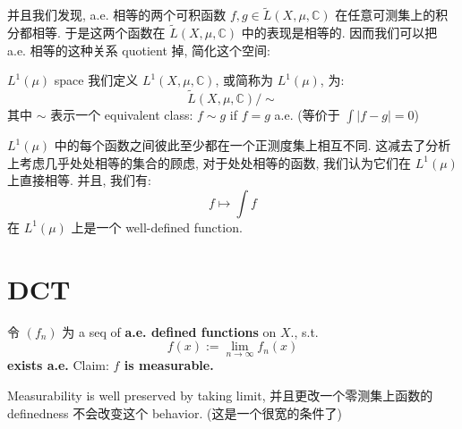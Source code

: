 \documentclass[lang=cn,11pt]{elegantbook}
\begin{document}
并且我们发现, a.e. 相等的两个可积函数 $f,g \in \tilde{L}(X, \mu, \mathbb{C})$ 在任意可测集上的积分都相等. 于是这两个函数在 $\tilde{L}(X, \mu, \mathbb{C})$ 中的表现是相等的. 因而我们可以把 a.e. 相等的这种关系 quotient 掉, 简化这个空间:


\begin{definition}{$L^1(\mu)$ space}
    我们定义 $L^1(X, \mu, \mathbb{C})$, 或简称为 $L^1(\mu)$, 为:$$
    \tilde{L}(X, \mu, \mathbb{C}) / \sim 
    $$
其中 $\sim$ 表示一个 equivalent class: $f\sim g$ if $f=g$ a.e. (等价于 $\int |f-g| = 0$)
 \end{definition}
$L^1(\mu)$ 中的每个函数之间彼此至少都在一个正测度集上相互不同. 这减去了分析上考虑几乎处处相等的集合的顾虑, 对于处处相等的函数, 我们认为它们在 $L^1(\mu)$ 上直接相等. 并且, 我们有: $$
f \mapsto \int f
$$
在 $L^1(\mu)$ 上是一个 well-defined function.




\section{DCT}


\begin{lemma}
    令 $(f_n)$ 为 a seq of \textbf{a.e. defined functions} on $X$., s.t. \[
    f(x) := \lim_{n\to \infty} f_n(x) 
    \] \textbf{exists a.e.}
    Claim: \textbf{$f$ is measurable.}
\end{lemma}
\begin{remark}
    Measurability is well preserved by taking limit, 并且更改一个零测集上函数的 definedness 不会改变这个 behavior. (这是一个很宽的条件了)
\end{remark}
\end{document}
